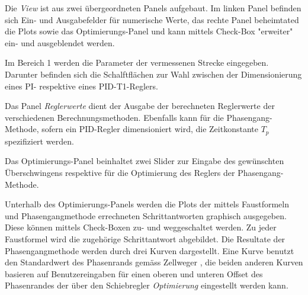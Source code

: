 Die  \emph{View} ist  aus  zwei \"ubergeordneten  Panels aufgebaut. Im  linken
Panel befinden sich Ein- und  Ausgabefelder f\"ur numerische Werte, das rechte
Panel  beheimtated die  Plots sowie  das Optimierungs-Panel  und kann  mittels
Check-Box "erweiter" ein- und ausgeblendet werden.




Im  Bereich 1    werden die  Parameter der  vermessenen
Strecke  eingegeben. Darunter  befinden  sich die  Schalftfl\"achen  zur  Wahl
  zwischen der  Dimensionierung eines
PI- respektive eines PID-T1-Reglers.

Das   Panel    \emph{Reglerwerte}   dient   der   Ausgabe    der   berechneten
Reglerwerte  der   verschiedenen  Berechnungsmethoden. Ebenfalls   kann  f\"ur
die  Phasengang-Methode,   sofern  ein  PID-Regler  dimensioniert   wird,  die
Zeitkonstante  $T_p$    spezifiziert  werden.

Das Optimierungs-Panel  beinhaltet zwei  Slider zur Eingabe  des gew\"unschten
\"Uberschwingens   respektive   f\"ur   die  Optimierung   des   Reglers   der
Phasengang-Methode.

Unterhalb des  Optimierungs-Panels werden  die Plots der  mittels Faustformeln
und Phasengangmethode errechneten Schrittantworten graphisch ausgegeben. Diese
k\"onnen   mittels  Check-Boxen   zu-  und   weggeschaltet  werden. Zu   jeder
Faustformel wird die zugeh\"orige Schrittantwort abgebildet. Die Resultate der
Phasengangmethode  werden durch  drei Kurven  dargestellt. Eine Kurve  benutzt
den  Standardwert des  Phasenrands gem\"ass  Zellweger , die beiden anderen Kurven basieren auf Benutzereingaben f\"ur einen
oberen  und  unteren  Offset  des Phasenrandes  der  \"uber  den  Schiebregler
\emph{Optimierung} eingestellt werden kann.
